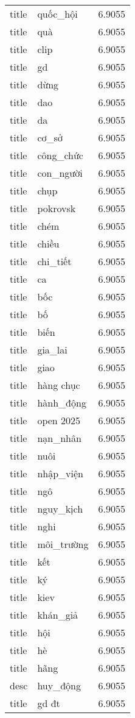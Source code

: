 \documentclass{article}
\begin{document}
\begin{tabular}{lll}
title & quốc\_hội & 6.9055\\
title & quà & 6.9055\\
title & clip & 6.9055\\
title & gd & 6.9055\\
title & dừng & 6.9055\\
title & dao & 6.9055\\
title & da & 6.9055\\
title & cơ\_sở & 6.9055\\
title & công\_chức & 6.9055\\
title & con\_người & 6.9055\\
title & chụp & 6.9055\\
title & pokrovsk & 6.9055\\
title & chém & 6.9055\\
title & chiều & 6.9055\\
title & chi\_tiết & 6.9055\\
title & ca & 6.9055\\
title & bốc & 6.9055\\
title & bố & 6.9055\\
title & biến & 6.9055\\
title & gia\_lai & 6.9055\\
title & giao & 6.9055\\
title & hàng chục & 6.9055\\
title & hành\_động & 6.9055\\
title & open 2025 & 6.9055\\
title & nạn\_nhân & 6.9055\\
title & nuôi & 6.9055\\
title & nhập\_viện & 6.9055\\
title & ngô & 6.9055\\
title & nguy\_kịch & 6.9055\\
title & nghi & 6.9055\\
title & môi\_trường & 6.9055\\
title & kết & 6.9055\\
title & ký & 6.9055\\
title & kiev & 6.9055\\
title & khán\_giả & 6.9055\\
title & hội & 6.9055\\
title & hè & 6.9055\\
title & hãng & 6.9055\\
desc & huy\_động & 6.9055\\
title & gd đt & 6.9055\\

\end{tabular}
\end{document}

